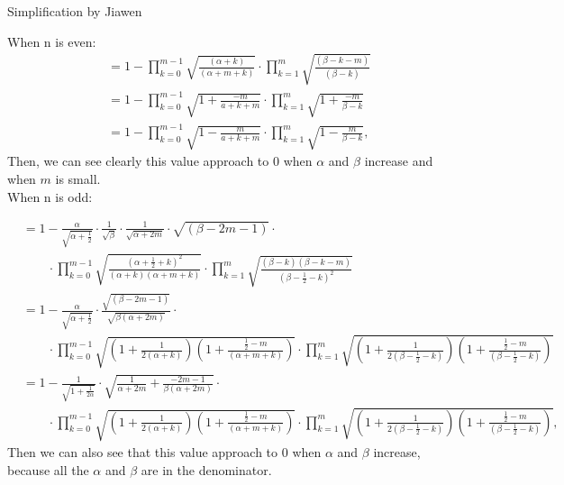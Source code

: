 \documentclass[runningheads,a4paper]{llncs}
\begin{document}
Simplification by Jiawen

When n is even:
\begin{align*}
&= 1 - \prod_{k = 0}^{m-1}
\sqrt{\frac{(\alpha + k)}{(\alpha + m + k)}}
\cdot
\prod_{k = 1}^{m} 
\sqrt{
\frac{(\beta - k - m)}{(\beta - k)}
}\\
& = 1 - \prod_{k = 0}^{m - 1}
\sqrt{1 + \frac{- m}{a + k + m}}
\cdot
\prod_{k = 1}^{m}
\sqrt{1 + \frac{- m}{\beta - k}} \\
& = 1 - \prod_{k = 0}^{m - 1}
\sqrt{1 - \frac{m}{a + k + m}}
\cdot
\prod_{k = 1}^{m}
\sqrt{1 - \frac{m}{\beta - k}},
\end{align*}
Then, we can see clearly this value approach to 0 when $\alpha$ and $\beta$ increase and when $m$ is small.
\\

When n is odd:

\begin{align*}
& = 
1 - \frac{\alpha}{\sqrt{\alpha + \frac{1}{2}}} \cdot \frac{1}{\sqrt{\beta}} \cdot \frac{1}{\sqrt{\alpha + 2m}} \cdot \sqrt{(\beta - 2m - 1)}\cdot \\
&\qquad \cdot 
\prod_{k = 0}^{m-1}
\sqrt{\frac{(\alpha + \frac{1}{2} + k)^2}{(\alpha + k)(\alpha + m  + k)}} \cdot 
\prod_{k = 1}^{m} \sqrt{\frac{(\beta - k)(\beta - k - m)}{(\beta - \frac{1}{2}- k)^2}}\\
& = 
1 - \frac{\alpha}{\sqrt{\alpha + \frac{1}{2}}} \cdot 
\frac{\sqrt{(\beta - 2m - 1)}}{\sqrt{\beta(\alpha + 2m)}} \cdot \\
&\qquad \cdot 
\prod_{k = 0}^{m-1}
\sqrt{(1 + \frac{1}{2(\alpha + k)})
(1 + \frac{\frac{1}{2} - m}{(\alpha + m  + k)})
} \cdot 
\prod_{k = 1}^{m} 
\sqrt{(1 + \frac{1}{2(\beta - \frac{1}{2}- k)})(1 + \frac{\frac{1}{2} - m}{(\beta - \frac{1}{2}- k)})}\\
& = 
1 - \frac{1}{\sqrt{1 + \frac{1}{2\alpha}}} \cdot 
\sqrt{\frac{1}{\alpha + 2m} + \frac{- 2m - 1}{\beta(\alpha + 2m)}} \cdot \\
&\qquad \cdot 
\prod_{k = 0}^{m-1}
\sqrt{(1 + \frac{1}{2(\alpha + k)})
(1 + \frac{\frac{1}{2} - m}{(\alpha + m  + k)})
} \cdot 
\prod_{k = 1}^{m} 
\sqrt{(1 + \frac{1}{2(\beta - \frac{1}{2}- k)})(1 + \frac{\frac{1}{2} - m}{(\beta - \frac{1}{2}- k)})},
\end{align*}
Then we can also see that this value approach to $0$ when $\alpha$ and $\beta$ increase, because all the $\alpha$ and $\beta$ are in the denominator. 
\end{document}
